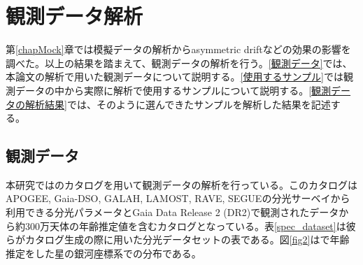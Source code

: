 \chapter{観測データ解析 \label{chapObs}}




第\ref{chapMock}章では模擬データの解析からasymmetric driftなどの効果の影響を調べた。以上の結果を踏まえて、観測データの解析を行う。\ref{観測データ}では、本論文の解析で用いた観測データについて説明する。\ref{使用するサンプル}では観測データの中から実際に解析で使用するサンプルについて説明する。\ref{観測データの解析結果}では、そのように選んできたサンプルを解析した結果を記述する。

\section{観測データ \label{観測データ}}
本研究では\cite{SD18}のカタログを用いて観測データの解析を行っている。このカタログはAPOGEE, Gaia-DSO, GALAH, LAMOST, RAVE, SEGUEの分光サーベイから利用できる分光パラメータとGaia Data Release 2 (DR2)で観測されたデータから約300万天体の年齢推定値を含むカタログとなっている。表\ref{spec_dataset}は彼らがカタログ生成の際に用いた分光データセットの表である。図\ref{fig2}は\cite{SD18}で年齢推定をした星の銀河座標系での分布である。

